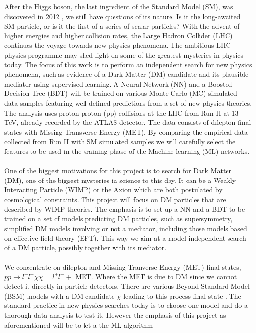 \documentclass[12pt, a4paper]{book}
\begin{document}
After the Higgs boson, the last ingredient of the Standard Model (SM), was discovered in 2012 \cite{Higgs_discovery_2012}, we still have questions of its nature. Is it the long-awaited SM particle, or is it the first of a series of scalar particles? 
With the advent of higher energies and higher collision rates, the Large Hadron Collider (LHC) continues the voyage towards new physics phenomena. The ambitious LHC physics programme may shed light on some of the greatest mysteries in physics today. 
The focus of this work is to perform an independent search for new physics phenomena, such as evidence of a Dark Matter (DM) candidate and its plausible mediator using supervised learning. A Neural Network (NN) and a Boosted Decision Tree (BDT) will 
be trained on various Monte Carlo (MC) simulated data samples featuring well defined predictions from a set of new physics theories. The analysis uses proton-proton (pp) collisions at the LHC from Run II at 13 TeV, already recorded by the ATLAS detector. 
The data consists of dilepton final states with Missing Transverse Energy (MET). By comparing the empirical data collected from Run II with SM simulated samples we will carefully select the features to be used in the training phase of the Machine learning 
(ML) networks. \\
\\ One of the biggest motivations for this project is to search for Dark Matter (DM), one of the biggest mysteries in science to this day. It can be a Weakly Interacting Particle (WIMP) \cite{WIMP} or the Axion \cite{Axion} which are both postulated by cosmological constraints. 
This project will focus on DM particles that are described by WIMP theories. The emphasis is to set up a NN and a BDT to be trained on a set of models predicting DM particles, such as supersymmetry, simplified DM models involving or not a mediator, including those 
models based on effective field theory (EFT). This way we aim at a model independent search of a DM particle, possibly together with its mediator.\\
\\ We concentrate on dilepton and Missing Tranverse Energy (MET) final states, $pp\rightarrow l^+l^- \chi\chi = l^+l^-+$ MET. Where the MET is due to DM since we cannot detect it directly in particle detectors. There are various Beyond Standard Model (BSM) models 
with a DM candidate $\chi$ leading to this process final state . The standard practice in new physics searches today is to choose one model and do a thorough data analysis to test it. However the emphasis of this project as aforementioned will be to let a the ML algorithm 
\end{document}

